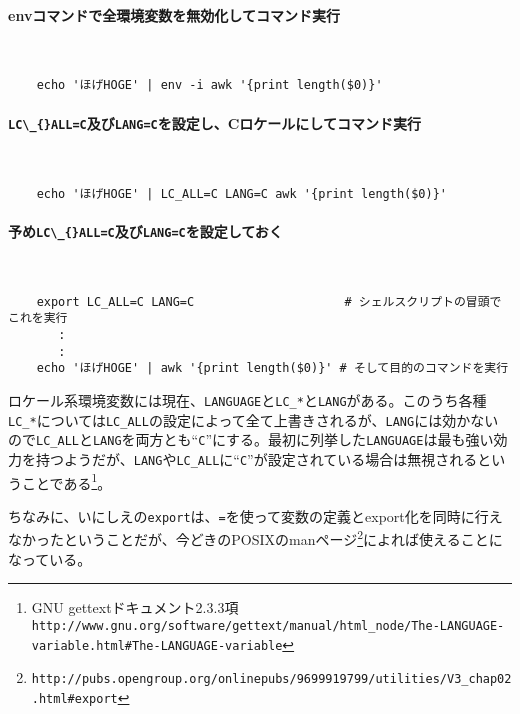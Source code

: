 \paragraph{envコマンドで全環境変数を無効化してコマンド実行} 　\\
\begin{frameboxit}{160.0mm}
\begin{verbatim}
	echo 'ほげHOGE' | env -i awk '{print length($0)}'
\end{verbatim}
\end{frameboxit}

\paragraph*{\verb|LC\_{}ALL=C|及び\verb|LANG=C|を設定し、Cロケールにしてコマンド実行} 　\\
\begin{frameboxit}{160.0mm}
\begin{verbatim}
	echo 'ほげHOGE' | LC_ALL=C LANG=C awk '{print length($0)}'
\end{verbatim}
\end{frameboxit}

\paragraph*{予め\verb|LC\_{}ALL=C|及び\verb|LANG=C|を設定しておく} 　\\
\begin{frameboxit}{160.0mm}
\begin{verbatim}
	export LC_ALL=C LANG=C                     # シェルスクリプトの冒頭でこれを実行
	   :
	   :
	echo 'ほげHOGE' | awk '{print length($0)}' # そして目的のコマンドを実行
\end{verbatim}
\end{frameboxit}

ロケール系環境変数には現在、\verb|LANGUAGE|と\verb|LC_*|と\verb|LANG|がある。このうち各種\verb|LC_*|については\verb|LC_ALL|の設定によって全て上書きされるが、\verb|LANG|には効かないので\verb|LC_ALL|と\verb|LANG|を両方とも``\verb|C|''にする。最初に列挙した\verb|LANGUAGE|は最も強い効力を持つようだが、\verb|LANG|や\verb|LC_ALL|に``\verb|C|''が設定されている場合は無視されるということである\footnote{GNU gettextドキュメント2.3.3項 \\ \verb|http://www.gnu.org/software/gettext/manual/html_node/The-LANGUAGE-variable.html#The-LANGUAGE-variable|}。

ちなみに、いにしえの\verb|export|は、\verb|=|を使って変数の定義とexport化を同時に行えなかったということだが、今どきのPOSIXのmanページ\footnote{\verb|http://pubs.opengroup.org/onlinepubs/9699919799/utilities/V3_chap02.html#export|}によれば使えることになっている。
　 \\

